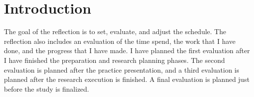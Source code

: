 \section{Introduction} \label{introduction}
The goal of the reflection is to set, evaluate, and adjust the schedule. The reflection also includes an evaluation of the time spend, the work that I have done, and the progress that I have made. I have planned the first evaluation after I have finished the preparation and research planning phases. The second evaluation is planned after the practice presentation, and a third evaluation is planned after the research execution is finished. A final evaluation is planned just before the study is finalized.